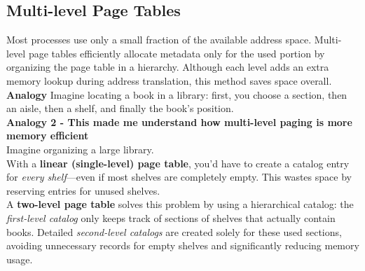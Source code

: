 \subsection{Multi-level Page Tables}
\small
Most processes use only a small fraction of the available address space. Multi-level page tables efficiently allocate metadata only for the used portion by organizing the page table in a hierarchy. Although each level adds an extra memory lookup during address translation, this method saves space overall. \\[5px]
\textbf{Analogy} Imagine locating a book in a library: first, you choose a section, then an aisle, then a shelf, and finally the book's position. \\[5px]
\textbf{Analogy 2  - This made me understand how multi-level paging is more memory efficient}\\
Imagine organizing a large library. \\[4px]
With a \textbf{linear (single-level) page table}, you'd have to create a catalog entry for \textit{every shelf}—even if most shelves are completely empty. This wastes space by reserving entries for unused shelves. \\[4px]
A \textbf{two-level page table} solves this problem by using a hierarchical catalog: the \textit{first-level catalog} only keeps track of sections of shelves that actually contain books. Detailed \textit{second-level catalogs} are created solely for these used sections, avoiding unnecessary records for empty shelves and significantly reducing memory usage.\\

